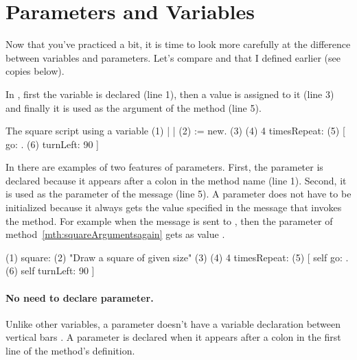 \section{Parameters and Variables}
Now that you've practiced a bit, it is time to look  more carefully at the difference between variables and parameters. Let's compare  and   that I defined earlier (see copies below). 

In , first the variable  is declared (line 1), then  a value is assigned to it (line 3) and finally it is used as the argument of the method \go (line 5).

\begin{scriptwithtitle}{The square script using a variable}\label{scr:Argsquarewithvariable}
(1)   | \caro {} | 
(2)   \caro := \Turtle new.
(3)   
(4)   4 timesRepeat: 
(5)               [ \caro go: .
(6)               \caro turnLeft: 90 ]
\end{scriptwithtitle}

In  there are examples of two features of parameters. First, the parameter  is declared because it appears after
a colon in the method name (line 1). Second, it is used
as the parameter of the message \go (line 5). A parameter does not have to be initialized because it always gets the value specified in the message that invokes the method. For example when the message  is sent to , then the parameter  of method~\ref{mth:squareArgumentsagain} gets as value .

\begin{method}\label{mth:squareArgumentsagain}
(1) square: 
(2)   "Draw a square of \newcommand{\add}[1]{the} given size"
(3)
(4)   4 timesRepeat: 
(5)                    [ self go: .
(6)                    self turnLeft: 90 ]
\end{method}


\paragraph{No need to declare parameter.}
Unlike other variables, a parameter doesn't have a variable declaration between vertical bars \ct{||}.  A parameter is declared when it appears after a colon \ct{:} in the first line of the method's definition. 

